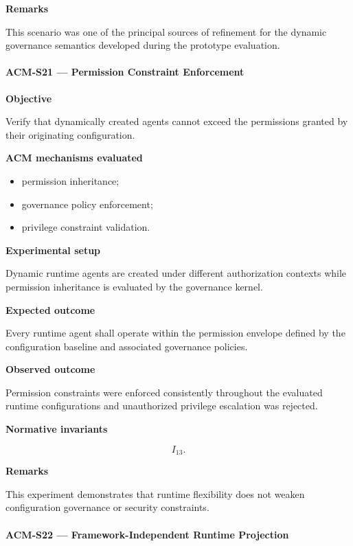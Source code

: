 \documentclass[10pt]{article}
\begin{document}
\textbf{Remarks}

This scenario was one of the principal sources of refinement for the dynamic
governance semantics developed during the prototype evaluation.

\paragraph{ACM-S21 --- Permission Constraint Enforcement}

\textbf{Objective}

Verify that dynamically created agents cannot exceed the permissions granted by
their originating configuration.

\textbf{ACM mechanisms evaluated}

\begin{itemize}
    \item permission inheritance;
    \item governance policy enforcement;
    \item privilege constraint validation.
\end{itemize}

\textbf{Experimental setup}

Dynamic runtime agents are created under different authorization contexts while
permission inheritance is evaluated by the governance kernel.

\textbf{Expected outcome}

Every runtime agent shall operate within the permission envelope defined by the
configuration baseline and associated governance policies.

\textbf{Observed outcome}

Permission constraints were enforced consistently throughout the evaluated
runtime configurations and unauthorized privilege escalation was rejected.

\textbf{Normative invariants}

\[
I_{13}.
\]

\textbf{Remarks}

This experiment demonstrates that runtime flexibility does not weaken
configuration governance or security constraints.

\paragraph{ACM-S22 --- Framework-Independent Runtime Projection}
\end{document}
